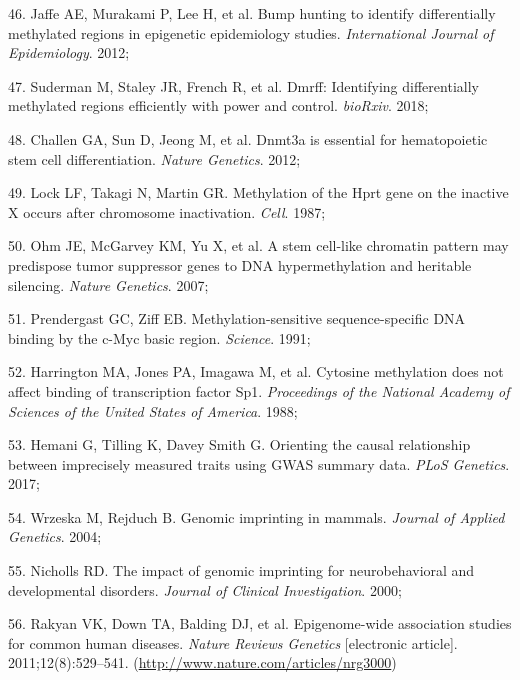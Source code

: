 \documentclass[11pt,twoside]{bristolthesis}
\newenvironment{cslreferences}%
  {}%
  {\par}
\begin{document}
\begin{cslreferences}
\leavevmode\hypertarget{ref-Jaffe2012}{}%
46. Jaffe AE, Murakami P, Lee H, et al. Bump hunting to identify differentially methylated regions in epigenetic epidemiology studies. \emph{International Journal of Epidemiology}. 2012;

\leavevmode\hypertarget{ref-Suderman2018}{}%
47. Suderman M, Staley JR, French R, et al. Dmrff: Identifying differentially methylated regions efficiently with power and control. \emph{bioRxiv}. 2018;

\leavevmode\hypertarget{ref-Challen2012}{}%
48. Challen GA, Sun D, Jeong M, et al. Dnmt3a is essential for hematopoietic stem cell differentiation. \emph{Nature Genetics}. 2012;

\leavevmode\hypertarget{ref-Lock1987}{}%
49. Lock LF, Takagi N, Martin GR. Methylation of the Hprt gene on the inactive X occurs after chromosome inactivation. \emph{Cell}. 1987;

\leavevmode\hypertarget{ref-Ohm2007}{}%
50. Ohm JE, McGarvey KM, Yu X, et al. A stem cell-like chromatin pattern may predispose tumor suppressor genes to DNA hypermethylation and heritable silencing. \emph{Nature Genetics}. 2007;

\leavevmode\hypertarget{ref-Prendergast1991}{}%
51. Prendergast GC, Ziff EB. Methylation-sensitive sequence-specific DNA binding by the c-Myc basic region. \emph{Science}. 1991;

\leavevmode\hypertarget{ref-Harrington1988}{}%
52. Harrington MA, Jones PA, Imagawa M, et al. Cytosine methylation does not affect binding of transcription factor Sp1. \emph{Proceedings of the National Academy of Sciences of the United States of America}. 1988;

\leavevmode\hypertarget{ref-Hemani2017}{}%
53. Hemani G, Tilling K, Davey Smith G. Orienting the causal relationship between imprecisely measured traits using GWAS summary data. \emph{PLoS Genetics}. 2017;

\leavevmode\hypertarget{ref-Wrzeska2004}{}%
54. Wrzeska M, Rejduch B. Genomic imprinting in mammals. \emph{Journal of Applied Genetics}. 2004;

\leavevmode\hypertarget{ref-Nicholls2000}{}%
55. Nicholls RD. The impact of genomic imprinting for neurobehavioral and developmental disorders. \emph{Journal of Clinical Investigation}. 2000;

\leavevmode\hypertarget{ref-Rakyan2011}{}%
56. Rakyan VK, Down TA, Balding DJ, et al. Epigenome-wide association studies for common human diseases. \emph{Nature Reviews Genetics} {[}electronic article{]}. 2011;12(8):529--541. (\url{http://www.nature.com/articles/nrg3000})


\end{cslreferences}
\end{document}
